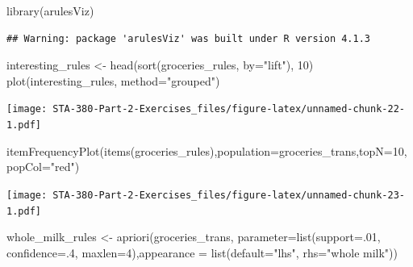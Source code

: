 \documentclass[
]{article}
\newenvironment{Shaded}{\begin{snugshade}}{\end{snugshade}}
\newcommand{\AttributeTok}[1]{\textcolor[rgb]{0.77,0.63,0.00}{#1}}
\newcommand{\DecValTok}[1]{\textcolor[rgb]{0.00,0.00,0.81}{#1}}
\newcommand{\FunctionTok}[1]{\textcolor[rgb]{0.00,0.00,0.00}{#1}}
\newcommand{\NormalTok}[1]{#1}
\newcommand{\OtherTok}[1]{\textcolor[rgb]{0.56,0.35,0.01}{#1}}
\newcommand{\StringTok}[1]{\textcolor[rgb]{0.31,0.60,0.02}{#1}}
\begin{document}
\begin{Shaded}
\begin{Highlighting}[]
\FunctionTok{library}\NormalTok{(arulesViz)}
\end{Highlighting}
\end{Shaded}

\begin{verbatim}
## Warning: package 'arulesViz' was built under R version 4.1.3
\end{verbatim}

\begin{Shaded}
\begin{Highlighting}[]
\NormalTok{interesting\_rules }\OtherTok{\textless{}{-}} \FunctionTok{head}\NormalTok{(}\FunctionTok{sort}\NormalTok{(groceries\_rules, }\AttributeTok{by=}\StringTok{"lift"}\NormalTok{), }\DecValTok{10}\NormalTok{)}
\FunctionTok{plot}\NormalTok{(interesting\_rules, }\AttributeTok{method=}\StringTok{"grouped"}\NormalTok{)}
\end{Highlighting}
\end{Shaded}

\texttt{[image: STA-380-Part-2-Exercises\_files/figure-latex/unnamed-chunk-22-1.pdf]}

\begin{Shaded}
\begin{Highlighting}[]
\FunctionTok{itemFrequencyPlot}\NormalTok{(}\FunctionTok{items}\NormalTok{(groceries\_rules),}\AttributeTok{population=}\NormalTok{groceries\_trans,}\AttributeTok{topN=}\DecValTok{10}\NormalTok{,}\AttributeTok{popCol=}\StringTok{"red"}\NormalTok{)}
\end{Highlighting}
\end{Shaded}

\texttt{[image: STA-380-Part-2-Exercises\_files/figure-latex/unnamed-chunk-23-1.pdf]}

\begin{Shaded}
\begin{Highlighting}[]
\NormalTok{whole\_milk\_rules }\OtherTok{\textless{}{-}} \FunctionTok{apriori}\NormalTok{(groceries\_trans, }
    \AttributeTok{parameter=}\FunctionTok{list}\NormalTok{(}\AttributeTok{support=}\NormalTok{.}\DecValTok{01}\NormalTok{, }\AttributeTok{confidence=}\NormalTok{.}\DecValTok{4}\NormalTok{, }\AttributeTok{maxlen=}\DecValTok{4}\NormalTok{),}\AttributeTok{appearance =} \FunctionTok{list}\NormalTok{(}\AttributeTok{default=}\StringTok{"lhs"}\NormalTok{, }\AttributeTok{rhs=}\StringTok{"whole milk"}\NormalTok{))}
\end{Highlighting}
\end{Shaded}
\end{document}

